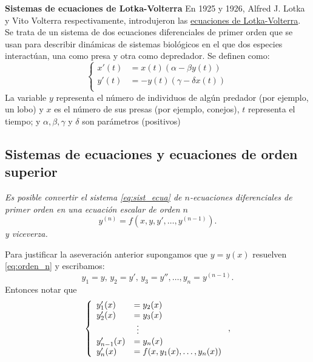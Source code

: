 \begin{ejemplo} \textbf{Sistemas de ecuaciones de Lotka-Volterra}
 En 1925 y 1926, Alfred J. Lotka y Vito Volterra respectivamente, introdujeron
 las \href{https://es.wikipedia.org/wiki/Ecuaciones_Lotka%E2%80%93Volterra}{ecuaciones de Lotka-Volterra}\link.   Se trata de un sistema de dos ecuaciones diferenciales de primer orden que se usan para describir dinámicas de sistemas biológicos en el que dos especies interactúan, una como presa y otra como depredador. Se definen como:
\begin{equation}\label{eq:lotka_volterra}
\left\{
\begin{split}
 x'(t) &= x(t) ( \alpha − \beta  y(t) )\\
  y'(t)&=-y(t)(\gamma-\delta x(t))\\
\end{split}\right.
\end{equation}
La variable $y$ representa el número de individuos de algún predador (por ejemplo, un lobo) y $x$ es el número de sus presas (por ejemplo, conejos), $t$ representa el tiempo; y  $\alpha,\beta,\gamma$ y $\delta$ son parámetros (positivos)

\end{ejemplo}


\subsection{Sistemas de ecuaciones y ecuaciones de orden superior}

\emph{Es posible convertir el sistema \eqref{eq:sist_ecua} de $n$-ecuaciones diferenciales de primer orden  en una ecuación escalar de orden $n$
\begin{equation}\label{eq:orden_n}
y^{(n)}=f(x,y,y',\ldots,y^{(n-1)}).
\end{equation}
y viceverza.}

Para justificar la aseveración anterior supongamos que $y=y(x)$ resuelven  \eqref{eq:orden_n} y escribamos:
\[y_1=y,\, y_2=y',\,y_3=y'',\ldots, y_{n}=y^{(n-1)}.\]
Entonces notar que
\begin{equation}\label{eq:sist_ecua_conv}
\left\{
\begin{array}{l l l}
 y_1'(x)&=y_2(x)\\
  y_2'(x)&=y_3(x)\\
       &\,\,\vdots\\
  y_{n-1}'(x)&=y_n(x)\\
 y_n'(x)&=f(x,y_1(x),\ldots,y_n(x))\\
\end{array}\right.,
\end{equation}

